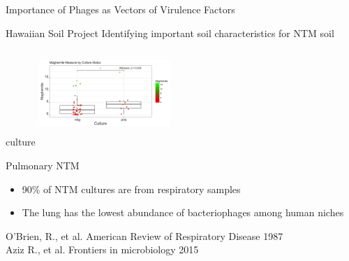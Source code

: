 \documentclass[11pt]{beamer}
\begin{document}
	\begin{frame}{Importance of Phages as Vectors of Virulence Factors}
	\begin{block}{Hawaiian Soil Project}
	Identifying important soil characteristics for NTM soil culture 
	\center
	\includegraphics[height=4cm, width=5cm]{soil.jpeg}
	
	\end{block}
	\vspace{-0.5cm}
	\begin{block}{Pulmonary NTM}
	\vspace{-0.3cm}
	\begin{itemize}
	\item 90\% of NTM cultures are from respiratory samples
	\item The lung has the lowest abundance of bacteriophages among human niches
	\end{itemize}
	\end{block}
	
	
	
	\tiny{O'Brien, R., et al. American Review of Respiratory Disease 1987 \\ Aziz R., et al. Frontiers in microbiology 2015}

	
	\end{frame}
	
\end{document}

